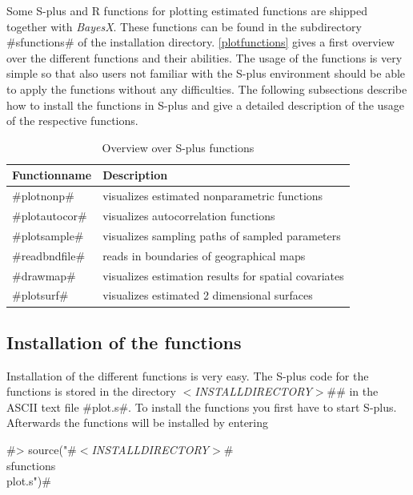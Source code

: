 Some S-plus and R functions for plotting estimated functions are
shipped together with {\em BayesX}. These functions can be found in
the subdirectory #sfunctions# of the installation directory.
\autoref{plotfunctions} gives a first overview over the different
functions and their abilities. The usage of the functions is very
simple so that also users not familiar with the S-plus environment
should be able to apply the functions without any difficulties. The
following subsections describe how to install the functions in
S-plus and give a detailed description of the usage of the
respective functions.

\begin{table}[ht]
\begin{center}
\begin{tabular}{|l|l|}
\hline
{\bf Functionname} & {\bf Description} \\
\hline
#plotnonp# & visualizes estimated nonparametric functions \\
#plotautocor# & visualizes autocorrelation functions \\
#plotsample# & visualizes sampling paths of sampled parameters \\
#readbndfile# & reads in boundaries of geographical maps \\
#drawmap# & visualizes estimation results for spatial covariates \\
#plotsurf# & visualizes estimated 2 dimensional surfaces \\
\hline
\end{tabular}
{\em\caption{\label{plotfunctions} Overview over S-plus
functions}}
\end{center}
\end{table}


\subsection{Installation of the functions} 

Installation of the different functions is very easy. The S-plus
code for the functions is stored in the directory {\em
$<$INSTALLDIRECTORY$>$}#\sfunctions# in the ASCII text file
#plot.s#. To install the functions you first have to start S-plus.
Afterwards the functions will be installed by entering

#> source("#{\em $<$INSTALLDIRECTORY$>$}#\\sfunctions\\plot.s")#


